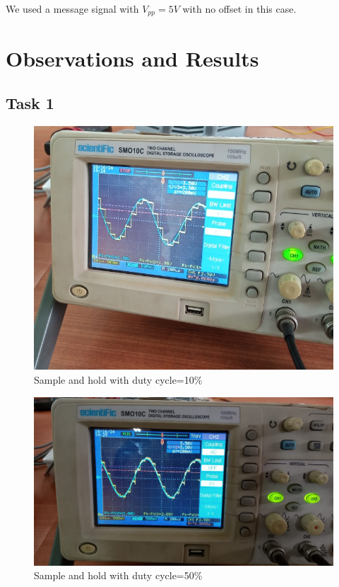 \documentclass{article}
\begin{document}
We used a message signal with $V_{pp}=5V$ with no offset in this case. 
\clearpage
\section{Observations and Results}
\subsection{Task 1}
\begin{figure}[!ht]
\includegraphics[width=\textwidth]{T1_D10.jpeg}
\caption{Sample and hold with duty cycle=10\%}
\label{fig:T1_D10}
\end{figure}

\begin{figure}[!ht]
\includegraphics[width=\textwidth]{T1_D50.jpeg}
\caption{Sample and hold with duty cycle=50\%}
\label{fig:T1_D50}
\end{figure}
\end{document}
